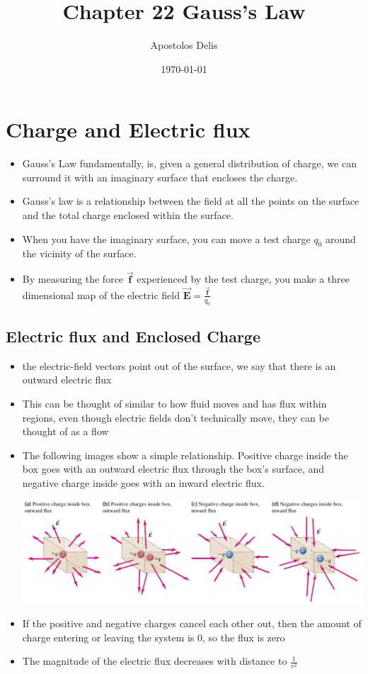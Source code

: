 \documentclass[11pt, a4paper]{article}
\begin{document}
\title{Chapter 22 Gauss's Law}
\author{Apostolos Delis}
\date{\today}
\maketitle

\tableofcontents
\section[22.1 Charge and Electric flux]{Charge and Electric flux}
\begin{itemize}
    \item Gauss's Law fundamentally, is, given a general distribution of charge, we can
        surround it with an imaginary surface that encloses the charge.
    \item  Gauss's law is a relationship between the field at all the points on the
        surface and the total charge enclosed within the surface.
    \item When you have the imaginary surface, you can move a test charge $q_0$ around
        the vicinity of the surface.
    \item By measuring the force $\vec{\mathbf{f}}$ experienced by the test charge, you
        make a three dimensional map of the electric field
        $\vec{\mathbf{E}} = \frac{\vec{\mathbf{f}}}{q_0}$
\end{itemize}
\subsection{Electric flux and Enclosed Charge}
\begin{itemize}
    \item  the electric-field vectors point out of the surface, we say that there is an
        outward electric flux
    \item This can be thought of similar to how fluid moves and has flux within regions,
        even though electric fields don't technically move, they can be thought of as
        a flow
    \item The following images show a simple relationship. Positive charge inside the
        box goes with an outward electric flux through the box's surface, and negative
        charge inside goes with an inward electric flux.

\includegraphics[scale=0.65]{images/electric_flux.png}

    \item If the positive and negative charges cancel each other out, then the amount of
        charge entering or leaving the system is 0, so the flux is zero
    \item The magnitude of the electric flux decreases with distance to $\frac{1}{r^2}$
\end{itemize}
\end{document}
